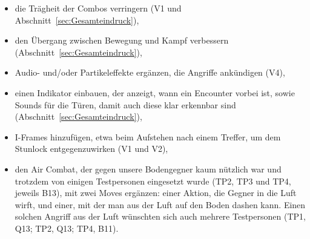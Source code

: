 \documentclass[../Main.tex]{subfiles}
\begin{document}
\begin{itemize}[leftmargin=1.5cm]
    \item die Trägheit der Combos verringern (V1 und Abschnitt~\ref{sec:Gesamteindruck}),
    \item den Übergang zwischen Bewegung und Kampf verbessern (Abschnitt~\ref{sec:Gesamteindruck}),
    \item Audio- und/oder Partikeleffekte ergänzen, die Angriffe ankündigen (V4),
    \item einen Indikator einbauen, der anzeigt, wann ein Encounter vorbei ist, sowie Sounds für die Türen, damit auch diese klar erkennbar sind (Abschnitt~\ref{sec:Gesamteindruck}),
    \item I-Frames hinzufügen, etwa beim Aufstehen nach einem Treffer, um dem Stunlock entgegenzuwirken (V1 und V2),
    \item den Air Combat, der gegen unsere Bodengegner kaum nützlich war und trotzdem von einigen Testpersonen eingesetzt wurde (TP2, TP3 und TP4, jeweils B13), mit zwei Moves ergänzen: einer Aktion, die Gegner in die Luft wirft, und einer, mit der man aus der Luft auf den Boden dashen kann. Einen solchen Angriff aus der Luft wünschten sich auch mehrere Testpersonen (TP1, Q13; TP2, Q13; TP4, B11).
\end{itemize}
\end{document}
